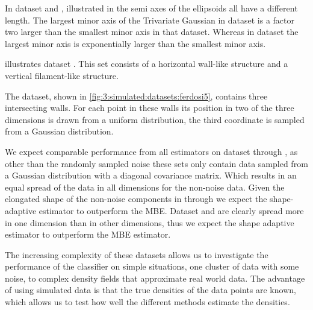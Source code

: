 In dataset \numberstringnum{\baakmanFourNum} and \numberstringnum{\baakmanFiveNum}, illustrated in  the semi axes of the ellipsoids all have a different length. The largest minor axis of the Trivariate Gaussian in dataset \numberstringnum{\baakmanFourNum} is a factor two larger than the smallest minor axis in that dataset. Whereas in dataset \numberstringnum{\baakmanFiveNum} the largest minor axis is exponentially larger than the smallest minor axis. 

	 illustrates dataset \numberstringnum{\ferdosiFourNum}. This set consists of a horizontal wall-like structure and a vertical filament-like structure. 

	The \ordinalstringnum{\ferdosiFiveNum} dataset, shown in \cref{fig:3:simulated:datasets:ferdosi5}, contains three intersecting walls. For each point in these walls its position in two of the three dimensions is drawn from a uniform distribution, the third coordinate is sampled from a Gaussian distribution.

We expect comparable performance from all estimators on dataset \numberstringnum{\ferdosiOneNum} through \numberstringnum{\ferdosiThreeNum}, as other than the randomly sampled noise these sets only contain data sampled from a Gaussian distribution with a diagonal covariance matrix. Which results in an equal spread of the data in all dimensions for the non-noise data. 
Given the elongated shape of the non-noise components in \numberstringnum{\baakmanOneNum} through \numberstringnum{\baakmanFiveNum} we expect the shape-adaptive estimator to outperform the MBE. 
Dataset \numberstringnum{\ferdosiFourNum} and \numberstringnum{\ferdosiFiveNum} are clearly spread more in one dimension than in other dimensions, thus we expect the shape adaptive estimator to outperform the MBE estimator.

The increasing complexity of these datasets allows us to investigate the performance of the classifier on simple situations, one cluster of data with some noise, to complex density fields that approximate real world data. The advantage of using simulated data is that the true densities of the data points are known, which allows us to test how well the different methods estimate the densities.